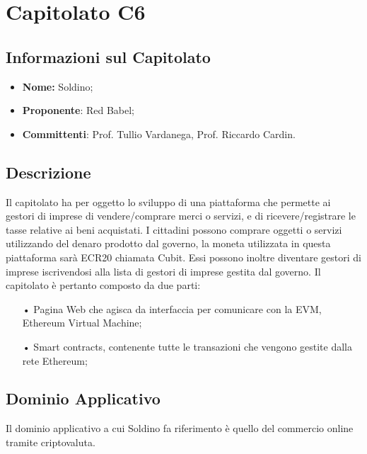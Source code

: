 \section{Capitolato C6}
\subsection{Informazioni sul Capitolato}
\begin{itemize}
	\item \textbf{Nome:} Soldino;
	\item \textbf{Proponente}: Red Babel;
	\item \textbf{Committenti}: Prof. Tullio Vardanega, Prof. Riccardo Cardin.
\end{itemize}

\subsection{Descrizione}
Il capitolato ha per oggetto lo sviluppo di una piattaforma che permette ai gestori di imprese di \newline 
vendere/comprare merci o servizi, e di ricevere/registrare le tasse relative ai beni acquistati.\newline
I cittadini possono comprare oggetti o servizi utilizzando del denaro prodotto dal governo, la moneta utilizzata in questa piattaforma sarà ECR20 chiamata Cubit. Essi possono inoltre diventare gestori di imprese iscrivendosi alla lista di gestori di imprese gestita dal governo.  
Il capitolato è pertanto composto da due parti: 

\begin{itemize}

\item[•] Pagina Web che agisca da interfaccia per comunicare con la EVM, Ethereum Virtual Machine;
\item[•] Smart contracts, contenente tutte le transazioni che vengono gestite dalla rete Ethereum;

\end{itemize}

\subsection{Dominio Applicativo}
Il dominio applicativo a cui Soldino fa riferimento è quello del commercio online tramite criptovaluta. 

